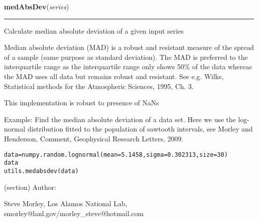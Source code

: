 \hspace{.8\funcindent}\begin{boxedminipage}{\funcwidth}

    \raggedright \textbf{medAbsDev}(\textit{series})

    \vspace{-1.5ex}

    \rule{\textwidth}{0.5\fboxrule}
\setlength{\parskip}{2ex}
    Calculate median absolute deviation of a given input series

    Median absolute deviation (MAD) is a robust and resistant measure of 
    the spread of a sample (same purpose as standard deviation). The MAD is
    preferred to the interquartile range as the interquartile range only 
    shows 50\% of the data whereas the MAD uses all data but remains robust
    and resistant. See e.g. Wilks, Statistical methods for the Atmospheric 
    Sciences, 1995, Ch. 3.

    This implementation is robust to presence of NaNs

    Example: Find the median absolute deviation of a data set. Here we use 
    the log- normal distribution fitted to the population of sawtooth 
    intervals, see Morley and Henderson, Comment, Geophysical Research 
    Letters, 2009.

\begin{alltt}
\pysrcprompt{{\textgreater}{\textgreater}{\textgreater} }data = numpy.random.lognormal(mean=5.1458, sigma=0.302313, size=30)
\pysrcprompt{{\textgreater}{\textgreater}{\textgreater} } data
\pysrcoutput{}\pysrcprompt{{\textgreater}{\textgreater}{\textgreater} }utils.medabsdev(data)
\end{alltt}
    (section) Author:

      Steve Morley, Los Alamos National Lab, 
      smorley@lanl.gov/morley\_steve@hotmail.com

\setlength{\parskip}{1ex}
    \end{boxedminipage}

    \label{spacepy:toolbox:makePoly}

    \vspace{0.5ex}

